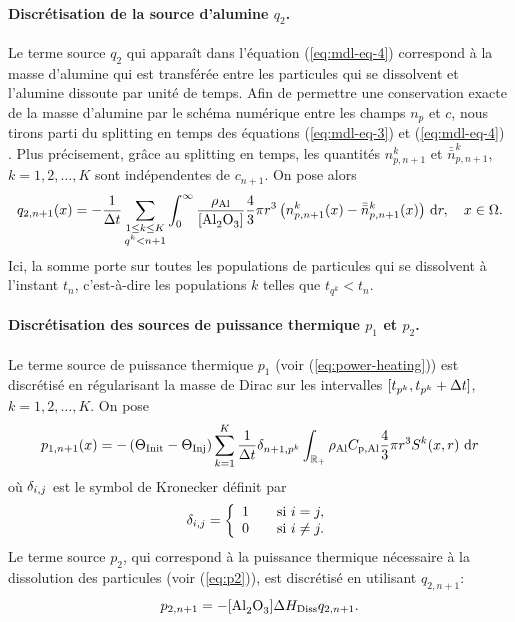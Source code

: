 \paragraph{Discrétisation de la source d'alumine $q_{2}$.}
Le terme source $q_{2}$ qui apparaît dans l'équation
(\ref{eq:mdl-eq-4}) correspond à la masse d'alumine qui est transférée
entre les particules qui se dissolvent et l'alumine dissoute par unité
de temps. Afin de permettre une conservation exacte de la masse d'alumine
par le schéma numérique entre les champs $n_p$ et $c$, nous
tirons parti du splitting en temps des équations (\ref{eq:mdl-eq-3})
et (\ref{eq:mdl-eq-4}) \cite{Hofer2011}. Plus précisement, grâce au
splitting en temps, les quantités $n_{p,n+1}^k$ et $\bar{\bar n}_{p,n+1}^k$, $k = 1, 2, \dots, K$
sont indépendentes de $c_{n+1}$. On pose alors
\begin{equation}\label{eq:q2}
  q_{2,n+1}(x) = -\frac{1}{\dt} \sum_{\substack{1\leq k\leq K\\ q^k < n+1}}
  \int_{0}^\infty
  \frac{\aluminadensity}{[\ce{Al2O3}]} \frac{4}{3}\pi r^3
  \parent{n_{p,n+1}^k(x) - \bar{\bar n}_{p,n+1}^k(x)} \intd{r}, \quad x\in\Omega.
\end{equation}
Ici, la somme porte sur toutes les populations de particules qui se
dissolvent à l'instant $t_n$, c'est-à-dire les populations $k$
telles que $t_{q^k} < t_n$.


\paragraph{Discrétisation des sources de puissance thermique $p_1$ et
$p_2$.} Le terme source de puissance thermique $p_1$ (voir (\ref{eq:power-heating})) est discrétisé
en régularisant la masse de Dirac sur les intervalles $[t_{p^k},
  t_{p^k} + \Delta t]$, $k = 1, 2, \dots, K$. On pose
\begin{equation}\label{eq:p1-discret}
p_{1,n+1}(x) = -\left( \Theta_\text{Init} - \Theta_\text{Inj} \right)\sum_{k = 1}^K
\frac{1}{\Delta t}\delta_{n+1,p^k}\int_{\mathbb R_+} \rho_\mathrm{Al}C_{\mathrm{p,Al}}
\frac{4}{3}\pi r^3S^k(x, r)\,\,\mathrm dr
\end{equation}
où $\delta_{i,j}$ est le symbol de Kronecker définit par
\begin{equation}
  \delta_{i,j} = \left\{
  \begin{array}{ll}
    1&\quad\text{si } i = j,\\
    0&\quad\text{si } i\neq j.
  \end{array}\right.
\end{equation}
Le terme source $p_2$, qui correspond à la puissance thermique
nécessaire à la dissolution des particules (voir (\ref{eq:p2})), est
discrétisé en utilisant $q_{2,n+1}$:
\begin{equation}\label{eq:p2-discret}
p_{2,n+1} = -[\cee{Al2O3}]\aluminadissolutionenthalpy q_{2,n+1}.
\end{equation}

